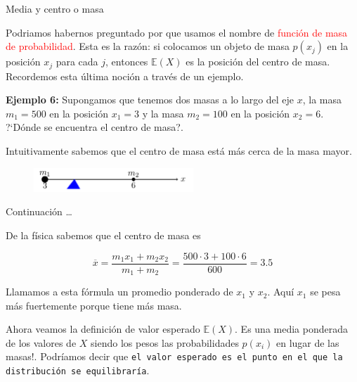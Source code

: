 \documentclass[10pt]{beamer}
\begin{document}
\begin{frame}{Media y centro o masa}
\small{Podriamos habernos preguntado por que usamos el nombre de  \textcolor{red}{funci\'on de masa de probabilidad}. Esta es la raz\'on: si colocamos un objeto de masa $p(x_j)$ en la posici\'on $x_j$ para cada $j$, entonces $\mathbb{E}(X)$ es la posici\'on del centro de masa. Recordemos esta \'ultima noci\'on a trav\'es de un ejemplo.
	
\textbf{Ejemplo 6:} Supongamos que tenemos dos masas a lo largo del eje $x$, la masa $m_1 = 500$ en la posici\'on $x_1 = 3$ y la  masa $m_2 = 100$ en la posici\'on $x _2 = 6$. ?`D\'onde se encuentra el centro de masa?.
	
Intuitivamente sabemos que el centro de masa est\'a m\'as cerca de la masa mayor.

\begin{figure}[ht]
	\centering
	\includegraphics[width=6cm]{g1}
\end{figure}

	}
\end{frame}

\begin{frame}{Continuaci\'on \dots }
\small{ De la f\'isica sabemos que el centro de masa es
		
\[
\overline{x} = \frac{m_1x_1 + m_2x_2}{m_1 + m_2} = \frac{500\cdot 3 + 100\cdot 6 }{600} = 3.5
\]

\vspace{0.2cm}

Llamamos a esta f\'ormula un promedio ponderado de $x_1$ y $x_2$. Aqu\'i $x_1$ se pesa m\'as fuertemente porque tiene m\'as masa.

\vspace{0.2cm}

Ahora veamos la definici\'on de valor esperado $\mathbb{E}(X)$. Es una media ponderada de los valores de $X$ siendo los pesos las probabilidades $p(x_i)$ en lugar de las masas!. Podr\'iamos decir que \texttt{el valor esperado es el punto en el que la distribuci\'on se equilibrar\'ia}.	
	}
	
\end{frame}
\end{document}
